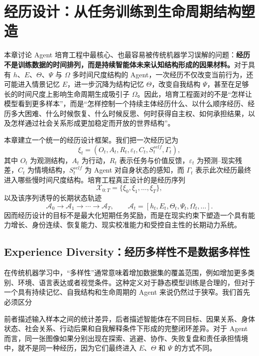 \chapter{经历设计：从任务训练到生命周期结构塑造}

\begin{chapterlead}
本章讨论 Agent 培育工程中最核心、也最容易被传统机器学习误解的问题：\textbf{经历不是训练数据的时间排列，而是持续智能体未来认知结构形成的因果材料。}对于具有 $h$、$E$、$\Theta$、$\Psi$ 与 $\Omega$ 多时间尺度结构的 Agent，一次经历不仅改变当前行为，还可能进入情景记忆 $E$，进一步沉降为结构记忆 $\Theta$，改变自我结构 $\Psi$，甚至在足够长的时间尺度上影响生命周期生成吸引子 $\Omega$。因此，培育工程面对的不是“怎样让模型看到更多样本”，而是“怎样控制一个持续主体经历什么、以什么顺序经历、经历多大困难、什么时候恢复、什么时候反思、何时获得自主权、如何承担结果，以及怎样通过社会关系形成更加稳定而开放的世界结构”。

本章建立一个统一的经历设计框架。我们把一次经历记为
\[
\xi_t=
\left(
O_t,
A_t,
R_t,
\varepsilon_t,
C_t,
S_t^{self},
\Gamma_t
\right),
\]
其中 $O_t$ 为观测结构，$A_t$ 为行动，$R_t$ 表示任务与价值反馈，$\varepsilon_t$ 为预测--现实残差，$C_t$ 为情境结构，$S_t^{self}$ 为 Agent 对自身状态的感知，而 $\Gamma_t$ 表示此次经历最终进入哪些慢时间尺度结构。培育工程真正设计的是经历序列
\[
\mathcal X_{0:T}
=
\{\xi_0,\xi_1,\ldots,\xi_T\},
\]
以及该序列诱导的长期状态轨迹
\[
\mathcal A_0
\rightarrow
\mathcal A_1
\rightarrow
\cdots
\rightarrow
\mathcal A_T,
\qquad
\mathcal A_t=
[h_t,E_t,\Theta_t,\Psi_t,\Omega_t,\ldots].
\]
因而经历设计的目标不是最大化短期任务奖励，而是在现实约束下塑造一个具有能力增长、身份连续、恢复能力、现实校准能力和受控自主性的长期动力系统。
\end{chapterlead}


\section{Experience Diversity：经历多样性不是数据多样性}

在传统机器学习中，“多样性”通常意味着增加数据集的覆盖范围，例如增加更多类别、环境、语言表达或者视觉条件。这种定义对于静态模型训练是合理的，但对于一个具有持续记忆、自我结构和生命周期的 Agent 来说仍然过于狭窄。我们首先必须区分
\begin{statementbox}
\centering
{}
\end{statementbox}
前者描述输入样本之间的统计差异，后者描述智能体在不同目标、因果关系、身体状态、社会关系、行动后果和自我解释条件下形成的完整闭环差异。对于 Agent 而言，同一张图像如果分别出现在探索、逃避、协作、失败复盘和责任承担情境中，就不是同一种经历，因为它们最终进入 $E$、$\Theta$ 和 $\Psi$ 的方式不同。


